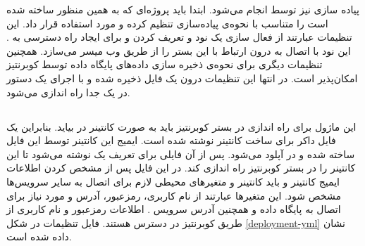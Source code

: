 پیاده سازی  نیز توسط  انجام می‌شود. ابتدا باید پروژه‌ای که به همین منظور ساخته شده است را متناسب با نحوه‌ی پیاده‌سازی تنظیم کرده و مورد استفاده قرار داد. این تنظیمات عبارتند از فعال سازی یک نود  و تعریف کردن  و  برای ایجاد راه دسترسی به . این نود با اتصال به   درون  ارتباط با این بستر را از طریق وب میسر می‌سازد. همچنین تنظیمات دیگری برای نحوه‌ی ذخیره سازی داده‌های پایگاه داده  توسط کوبرنتیز امکان‌پذیر است. در انتها این تنظیمات درون یک فایل ذخیره شده و  با اجرای یک دستور  در یک  جدا راه اندازی می‌شود.

\subsection{}

این ماژول برای راه اندازی در بستر کوبرنتیز باید به صورت کانتینر در بیاید. بنابراین یک فایل داکر برای ساخت کانتینر نوشته شده است. ایمیج این کانتینر توسط این فایل ساخته شده و در  آپلود می‌شود. پس از آن فایلی برای تعریف یک  نوشته می‌شود تا این کانتینر را در بستر کوبرنتیز راه اندازی کند. در این فایل پس از مشخص کردن اطلاعات ایمیج کانتینر و  باید  کانتینر و متغیرهای محیطی لازم برای اتصال به سایر سرویس‌ها مشخص شود. این متغیرها عبارتند از نام کاربری، رمزعبور، آدرس و  مورد نیاز برای اتصال به پایگاه داده  و همچنین آدرس سرویس . اطلاعات رمزعبور و نام کاربری از طریق  کوبرنتیز در دسترس هستند. فایل تنظیمات  در شکل \ref{deployment-yml} نشان داده شده است.

